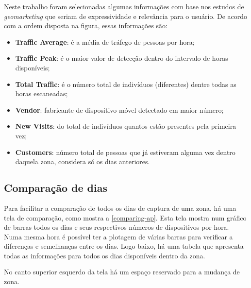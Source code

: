 Neste trabalho foram selecionadas algumas informações com base nos estudos de \emph{geomarketing} que seriam
de expressividade e relevância para o usuário. De acordo com a ordem disposta
na figura, essas informações são:

\begin{itemize}
    \item \textbf{Traffic Average}: é a média de tráfego de pessoas por hora;
    \item \textbf{Traffic Peak}: é o maior valor de detecção dentro do intervalo de horas disponíveis;
    \item \textbf{Total Traffic}: é o número total de indivíduos (diferentes) dentre todas as horas escaneadas;
    \item \textbf{Vendor}: fabricante de dispositivo móvel detectado em maior número;
    \item \textbf{New Visits}: do total de indivíduos quantos estão presentes pela primeira vez;
    \item \textbf{Customers}: número total de pessoas que já estiveram alguma vez dentro daquela zona, considera
    só os dias anteriores.
\end{itemize}

\subsection{Comparação de dias}
Para facilitar a comparação de todos os dias de captura de uma zona, há uma tela
de comparação, como mostra a \autoref{comparing-ap}. Esta tela mostra num
gráfico de barras todos os dias e seus respectivos números de dispositivos por
hora. Numa mesma hora é possível ter a plotagem de várias barras para verificar
a diferenças e semelhanças entre os dias. Logo baixo, há uma tabela que
apresenta todas as informações para todos os dias disponíveis dentro da zona.

No canto superior esquerdo da tela há um espaço reservado para a mudança de zona.

